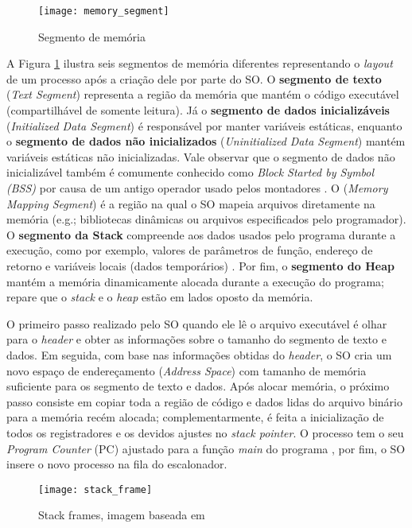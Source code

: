 \begin{figure}[!h]
  \centering
  \texttt{[image: memory\_segment]} 
  \caption{Segmento de memória}
  \label{fig:memory_segment} 
\end{figure}

A Figura \ref{fig:memory_segment} ilustra seis segmentos de memória diferentes
representando o \emph{layout} de um processo após a criação dele por parte do
SO. O \textbf{segmento de texto} (\emph{Text Segment}) representa a região da
memória que mantém o código executável (compartilhável de somente
leitura). Já o \textbf{segmento de dados inicializáveis} (\emph{Initialized
Data Segment}) é responsável por manter variáveis estáticas, enquanto o
\textbf{segmento de dados não inicializados} (\emph{Uninitialized Data
Segment}) mantém variáveis estáticas não inicializadas.  Vale observar que o
segmento de dados não inicializável também é comumente conhecido como
\emph{Block Started by Symbol (BSS)} por causa de um antigo operador usado
pelos montadores \citep{gdb}. O 
(\emph{Memory Mapping Segment}) é a região na qual o SO mapeia arquivos
diretamente na memória (e.g.; bibliotecas dinâmicas ou arquivos especificados
pelo programador). O \textbf{segmento da Stack} compreende aos dados usados
pelo programa durante a execução, como por exemplo, valores de parâmetros de
função, endereço de retorno e variáveis locais (dados temporários)
\citep{silberschatz}.  Por fim, o \textbf{segmento do Heap} mantém a memória
dinamicamente alocada durante a execução do programa; repare que o \emph{stack}
e o \emph{heap} estão em lados oposto da memória.

O primeiro passo realizado pelo SO quando ele lê o arquivo executável é olhar
para o \emph{header} e obter as informações sobre o tamanho do segmento de
texto e dados. Em seguida, com base nas informações obtidas do \emph{header}, o
SO cria um novo espaço de endereçamento (\emph{Address Space}) com tamanho de
memória suficiente para os segmento de texto e dados. Após alocar memória, o
próximo passo consiste em copiar toda a região de código e dados lidas do
arquivo binário para a memória recém alocada; complementarmente, é feita a
inicialização de todos os registradores e os devidos ajustes no \emph{stack
pointer}. O processo tem o seu \emph{Program Counter} (PC) ajustado para a
função \emph{main} do programa \citep{patterson}, por fim, o SO insere o novo
processo na fila do escalonador.

\begin{figure}[!h]
  \centering
  \texttt{[image: stack\_frame]}
  \caption{Stack frames, imagem baseada em \cite{patterson}}
  \label{fig:stack_frames} 
\end{figure}

